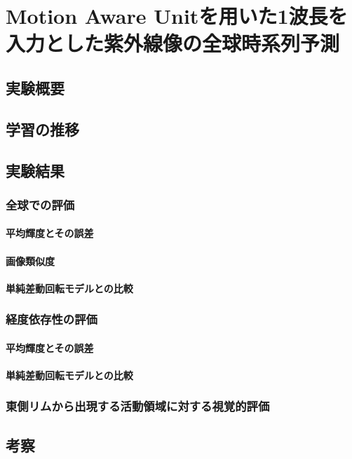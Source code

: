 \chapter{Motion Aware Unitを用いた1波長を入力とした紫外線像の全球時系列予測}
  \section{実験概要}
  \section{学習の推移}
  \section{実験結果}
    \subsection{全球での評価}
      \subsubsection{平均輝度とその誤差}
      \subsubsection{画像類似度}
      \subsubsection{単純差動回転モデルとの比較}
      \subsection{経度依存性の評価}
        \subsubsection{平均輝度とその誤差}
        \subsubsection{単純差動回転モデルとの比較}
    \subsection{東側リムから出現する活動領域に対する視覚的評価}
  \section{考察}
